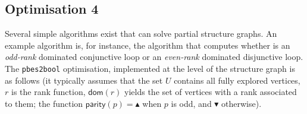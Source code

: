 \documentclass{article}
\newcommand{\up}{\blacktriangle}
\newcommand{\down}{\blacktriangledown}
\newcommand{\If}{\text{\textbf{if }}}
\newcommand{\Then}{\text{\textbf{ then }}}
\newcommand{\Return}{\text{\textbf{return }}}
\begin{document}
\subsection{Optimisation 4}
Several simple algorithms exist that can solve partial structure graphs. An example
algorithm is, for instance, the algorithm that computes whether is an
\emph{odd-rank} dominated conjunctive loop or an \emph{even-rank} dominated disjunctive loop.
The \texttt{pbes2bool} optimisation, implemented at the level of the structure graph is as
follows (it typically assumes that the set $U$ contains all fully explored vertices, $r$ is
the rank function, $\textsf{dom}(r)$ yields the set of vertices with a rank associated to
them; the function $\mathsf{parity}(p) = \up$ when $p$ is odd, and $\down$ otherwise).
\end{document}
